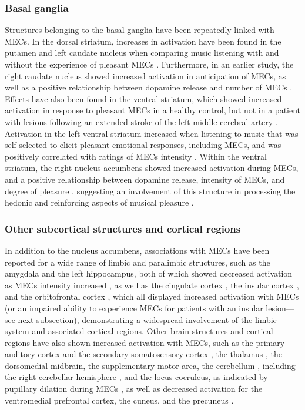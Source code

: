 \subsubsection{Basal ganglia}

Structures belonging to the basal ganglia have been repeatedly linked with MECs. In the dorsal striatum, increases in activation have been found in the putamen and left caudate nucleus when comparing music listening with and without the experience of pleasant MECs \parencite{klepzig2020}. Furthermore, in an earlier study, the right caudate nucleus showed increased activation in anticipation of MECs, as well as a positive relationship between dopamine release and number of MECs \parencite{salimpoor2011}. Effects have also been found in the ventral striatum, which showed increased activation in response to pleasant MECs in a healthy control, but not in a patient with lesions following an extended stroke of the left middle cerebral artery \parencite{grunkina2017}. Activation in the left ventral striatum increased when listening to music that was self-selected to elicit pleasant emotional responses, including MECs, and was positively correlated with ratings of MECs intensity \parencite{blood2001}. Within the ventral striatum, the right nucleus accumbens showed increased activation during MECs, and a positive relationship between dopamine release, intensity of MECs, and degree of pleasure \parencite{salimpoor2011}, suggesting an involvement of this structure in processing the hedonic and reinforcing aspects of musical pleasure \parencite{chanda2013}.

\subsubsection{Other subcortical structures and cortical regions}

In addition to the nucleus accumbens, associations with MECs have been reported for a wide range of limbic and paralimbic structures, such as the amygdala \parencite{griffiths2004, grunkina2017} and the left hippocampus, both of which showed decreased activation as MECs intensity increased \parencite{blood2001}, as well as the cingulate cortex \parencite{blood2001}, the insular cortex \parencite{blood2001, griffiths2004, grunkina2017, klepzig2020}, and the orbitofrontal cortex \parencite{blood2001}, which all displayed increased activation with MECs (or an impaired ability to experience MECs for patients with an insular lesion---see next subsection), demonstrating a widespread involvement of the limbic system and associated cortical regions. Other brain structures and cortical regions have also shown increased activation with MECs, such as the primary auditory cortex and the secondary somatosensory cortex \parencite{grunkina2017}, the thalamus \parencite{blood2001, grunkina2017, klepzig2020}, the dorsomedial midbrain, the supplementary motor area, the cerebellum \parencite{blood2001}, including the right cerebellar hemisphere \parencite{klepzig2020}, and the locus coeruleus, as indicated by pupillary dilation during MECs \parencite{laeng2016}, as well as decreased activation for the ventromedial prefrontal cortex, the cuneus, and the precuneus \parencite{blood2001}.

